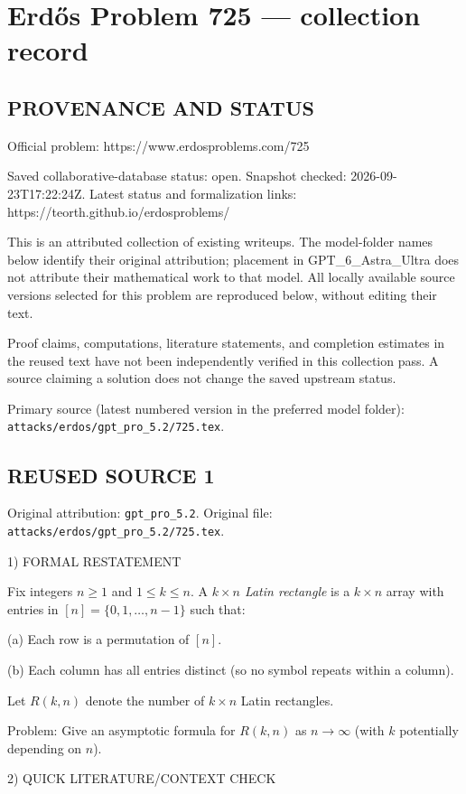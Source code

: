 \section*{Erd\H{o}s Problem 725 --- collection record}

\subsection*{PROVENANCE AND STATUS}
Official problem: https://www.erdosproblems.com/725

Saved collaborative-database status: open.
Snapshot checked: 2026-09-23T17:22:24Z.
Latest status and formalization links: https://teorth.github.io/erdosproblems/

This is an attributed collection of existing writeups. The model-folder names below identify their original attribution; placement in GPT\_6\_Astra\_Ultra does not attribute their mathematical work to that model. All locally available source versions selected for this problem are reproduced below, without editing their text.

Proof claims, computations, literature statements, and completion estimates in the reused text have not been independently verified in this collection pass. A source claiming a solution does not change the saved upstream status.

Primary source (latest numbered version in the preferred model folder): \texttt{attacks/erdos/gpt\_pro\_5.2/725.tex}.

\subsection*{REUSED SOURCE 1}
Original attribution: \texttt{gpt\_pro\_5.2}.
Original file: \texttt{attacks/erdos/gpt\_pro\_5.2/725.tex}.


1) FORMAL RESTATEMENT

Fix integers $n\ge 1$ and $1\le k\le n$.
A \emph{$k\times n$ Latin rectangle} is a $k\times n$ array with entries in $[n]=\{0,1,\dots,n-1\}$ such that:

(a) Each row is a permutation of $[n]$.

(b) Each column has all entries distinct (so no symbol repeats within a column).

Let $R(k,n)$ denote the number of $k\times n$ Latin rectangles.

Problem: Give an asymptotic formula for $R(k,n)$ as $n\to\infty$ (with $k$ potentially depending on $n$).

2) QUICK LITERATURE/CONTEXT CHECK

